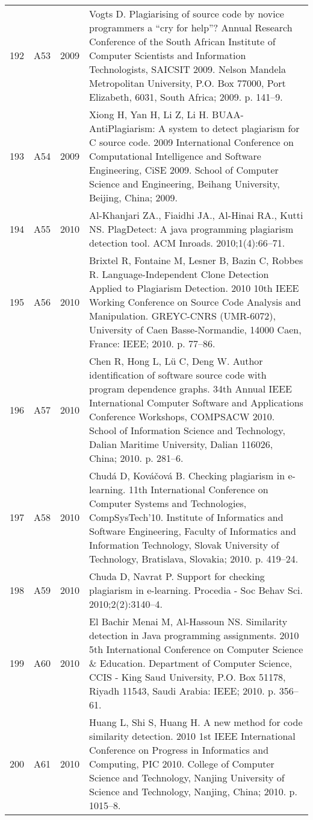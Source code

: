 \documentclass{article}\usepackage[]{graphicx}\usepackage[]{color}
\begin{document}
\begin{longtable}{l|L{1cm}|L{1cm}|L{12cm}|}
  192 & A53 & 2009 & Vogts D. Plagiarising of source code by novice programmers a “cry for help”? Annual Research Conference of the South African Institute of Computer Scientists and Information Technologists, SAICSIT 2009. Nelson Mandela Metropolitan University, P.O. Box 77000, Port Elizabeth, 6031, South Africa; 2009. p. 141–9. \\ 
  193 & A54 & 2009 & Xiong H, Yan H, Li Z, Li H. BUAA-AntiPlagiarism: A system to detect plagiarism for C source code. 2009 International Conference on Computational Intelligence and Software Engineering, CiSE 2009. School of Computer Science and Engineering, Beihang University, Beijing, China; 2009. \\ 
  194 & A55 & 2010 & Al-Khanjari ZA., Fiaidhi JA., Al-Hinai RA., Kutti NS. PlagDetect: A java programming plagiarism detection tool. ACM Inroads. 2010;1(4):66–71. \\ 
  195 & A56 & 2010 & Brixtel R, Fontaine M, Lesner B, Bazin C, Robbes R. Language-Independent Clone Detection Applied to Plagiarism Detection. 2010 10th IEEE Working Conference on Source Code Analysis and Manipulation. GREYC-CNRS (UMR-6072), University of Caen Basse-Normandie, 14000 Caen, France: IEEE; 2010. p. 77–86. \\ 
  196 & A57 & 2010 & Chen R, Hong L, Lü C, Deng W. Author identification of software source code with program dependence graphs. 34th Annual IEEE International Computer Software and Applications Conference Workshops, COMPSACW 2010. School of Information Science and Technology, Dalian Maritime University, Dalian 116026, China; 2010. p. 281–6. \\ 
  197 & A58 & 2010 & Chudá D, Kováčová B. Checking plagiarism in e-learning. 11th International Conference on Computer Systems and Technologies, CompSysTech’10. Institute of Informatics and Software Engineering, Faculty of Informatics and Information Technology, Slovak University of Technology, Bratislava, Slovakia; 2010. p. 419–24. \\ 
  198 & A59 & 2010 & Chuda D, Navrat P. Support for checking plagiarism in e-learning. Procedia - Soc Behav Sci. 2010;2(2):3140–4. \\ 
  199 & A60 & 2010 & El Bachir Menai M, Al-Hassoun NS. Similarity detection in Java programming assignments. 2010 5th International Conference on Computer Science \& Education. Department of Computer Science, CCIS - King Saud University, P.O. Box 51178, Riyadh 11543, Saudi Arabia: IEEE; 2010. p. 356–61. \\ 
  200 & A61 & 2010 & Huang L, Shi S, Huang H. A new method for code similarity detection. 2010 1st IEEE International Conference on Progress in Informatics and Computing, PIC 2010. College of Computer Science and Technology, Nanjing University of Science and Technology, Nanjing, China; 2010. p. 1015–8. \\ 

\end{longtable}
\end{document}
